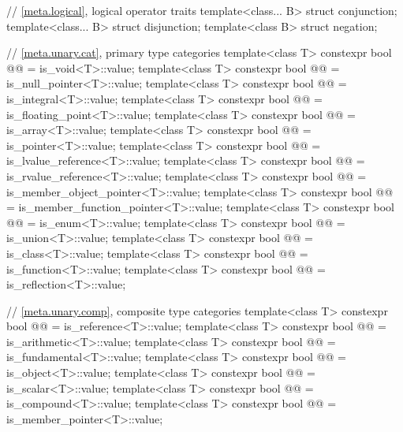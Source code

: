 \begin{codeblock}
{  // \ref{meta.logical}, logical operator traits
  template<class... B> struct conjunction;
  template<class... B> struct disjunction;
  template<class B> struct negation;

  // \ref{meta.unary.cat}, primary type categories
  template<class T>
    constexpr bool @@ = is_void<T>::value;
  template<class T>
    constexpr bool @@ = is_null_pointer<T>::value;
  template<class T>
    constexpr bool @@ = is_integral<T>::value;
  template<class T>
    constexpr bool @@ = is_floating_point<T>::value;
  template<class T>
    constexpr bool @@ = is_array<T>::value;
  template<class T>
    constexpr bool @@ = is_pointer<T>::value;
  template<class T>
    constexpr bool @@ = is_lvalue_reference<T>::value;
  template<class T>
    constexpr bool @@ = is_rvalue_reference<T>::value;
  template<class T>
    constexpr bool @@ = is_member_object_pointer<T>::value;
  template<class T>
    constexpr bool @@ = is_member_function_pointer<T>::value;
  template<class T>
    constexpr bool @@ = is_enum<T>::value;
  template<class T>
    constexpr bool @@ = is_union<T>::value;
  template<class T>
    constexpr bool @@ = is_class<T>::value;
  template<class T>
    constexpr bool @@ = is_function<T>::value;
  template<class T>
    constexpr bool @@ = is_reflection<T>::value;

  // \ref{meta.unary.comp}, composite type categories
  template<class T>
    constexpr bool @@ = is_reference<T>::value;
  template<class T>
    constexpr bool @@ = is_arithmetic<T>::value;
  template<class T>
    constexpr bool @@ = is_fundamental<T>::value;
  template<class T>
    constexpr bool @@ = is_object<T>::value;
  template<class T>
    constexpr bool @@ = is_scalar<T>::value;
  template<class T>
    constexpr bool @@ = is_compound<T>::value;
  template<class T>
    constexpr bool @@ = is_member_pointer<T>::value;

}
\end{codeblock}
